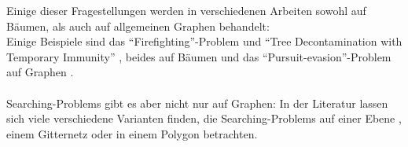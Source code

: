Einige dieser Fragestellungen werden in verschiedenen Arbeiten sowohl auf Bäumen, als auch auf allgemeinen Graphen behandelt:\\
Einige Beispiele sind das "`Firefighting"'-Problem und "`Tree Decontamination with Temporary Immunity"' \cite{tdti_paper}, beides auf Bäumen \cite{firefighterproblem_paper} und das "`Pursuit-evasion"'-Problem auf Graphen \cite{graph_paper_76}.
\\
\\
Searching-Problems gibt es aber nicht nur auf Graphen: In der Literatur lassen sich viele verschiedene  Varianten finden, die Searching-Problems auf einer Ebene \cite{klein_paper}, einem Gitternetz \cite{grid_paper_96} oder in einem Polygon \cite{polygon_paper} betrachten.

